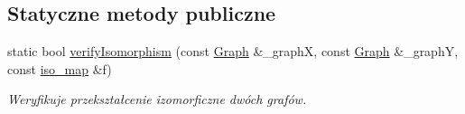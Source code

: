 \subsection*{Statyczne metody publiczne}
\begin{DoxyCompactItemize}
\item 
static bool \hyperlink{classIsomorphismAlgo_ae8249f495dbf6ac95c89f468ac9c1be4}{verify\-Isomorphism} (const \hyperlink{classGraph}{Graph} \&\-\_\-graph\-X, const \hyperlink{classGraph}{Graph} \&\-\_\-graph\-Y, const \hyperlink{classIsomorphismAlgo_ad95c1101cd4ef09d4a581d8fbe44aff0}{iso\-\_\-map} \&f)
\begin{DoxyCompactList}\small\item\em Weryfikuje przekształcenie izomorficzne dwóch grafów. \end{DoxyCompactList}\end{DoxyCompactItemize}
